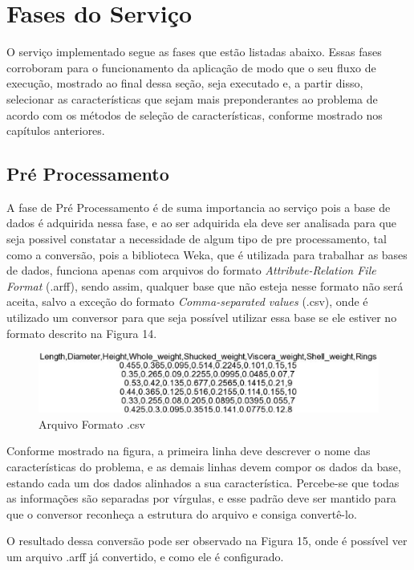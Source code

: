 \section{Fases do Serviço}
O serviço implementado segue as fases que estão listadas abaixo. Essas fases corroboram para o funcionamento da aplicação de modo que o seu fluxo de execução, mostrado ao final dessa seção, seja executado e, a partir disso, selecionar as características que sejam mais preponderantes ao problema de acordo com os métodos de seleção de características, conforme mostrado nos capítulos anteriores.
\subsection{Pré Processamento}

A fase de Pré Processamento é de suma importancia ao serviço pois a base de dados é adquirida nessa fase, e ao ser adquirida ela deve ser analisada para que seja possivel constatar a necessidade de algum tipo de pre processamento, tal como a conversão, pois a biblioteca Weka, que é utilizada para trabalhar as bases de dados, funciona apenas com arquivos do formato \textit{Attribute-Relation File Format} (.arff), sendo assim, qualquer base que não esteja nesse formato não será aceita, salvo a exceção do formato \textit{Comma-separated values} (.csv), onde é utilizado um conversor para que seja possível utilizar essa base se ele estiver no formato descrito na Figura 14.

\begin{figure}[H]
	\centering
	\label{fig15}
		\includegraphics[keepaspectratio=true,scale=0.5]{figuras/fig15.eps}
	\caption{Arquivo Formato .csv}
\end{figure}

Conforme mostrado na figura, a primeira linha deve descrever o nome das características do problema, e as demais linhas devem compor os dados da base, estando cada um dos dados alinhados a sua característica. Percebe-se que todas as informações são separadas por vírgulas, e esse padrão deve ser mantido para que o conversor reconheça a estrutura do arquivo e consiga convertê-lo.

O resultado dessa conversão pode ser observado na Figura 15, onde é possível ver um arquivo .arff já convertido, e como ele é configurado.

